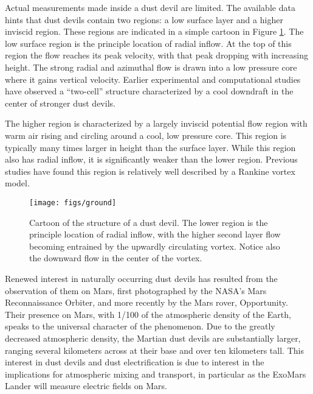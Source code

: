 %
%

Actual measurements made inside a dust devil are limited. The available
data hints that dust devils contain two regions: a low surface layer and
a higher inviscid region. These regions are indicated in a simple
cartoon in Figure \ref{fig:cartoon}. The low surface region is the
principle location of radial inflow. At the top of this region the flow
reaches its peak velocity, with that peak dropping with increasing
height. The strong radial and azimuthal flow is drawn into a low
pressure core where it gains vertical velocity. Earlier experimental and  
computational studies have observed a ``two-cell'' structure
characterized by a cool downdraft in the center of stronger dust
devils\cite{doi:10.3137/ao.420105,Sinclair1973}. 

The higher region is characterized by a largely inviscid potential flow
region with warm air rising and circling around a cool, low pressure
core. This region is typically many times larger in height than the
surface layer. While this region also has radial inflow, it is
significantly weaker than the lower region. Previous studies have found
this region is relatively well described by a Rankine vortex
model\cite{Sinclair1973,logan1971approach}. 

  \begin{figure}[!htb]
    \begin{center}
     \texttt{[image: figs/ground]}
     \caption{Cartoon of the structure of a dust devil. The lower region
     is the principle location of radial inflow, with the higher second
     layer flow becoming entrained by the upwardly circulating
     vortex. Notice also the downward flow in the center of the vortex.}
     \label{fig:cartoon}
    \end{center}
  \end{figure}


Renewed interest in naturally occurring dust devils has resulted from
the observation of them on Mars, first photographed by the NASA's Mars
Reconnaissance Orbiter\cite{?}, and more recently by the Mars rover,
Opportunity. Their presence on Mars, with 1/100 of the atmospheric
density of the Earth, speaks to the universal character of the
phenomenon. Due to the greatly decreased atmospheric density, the
Martian dust devils are substantially larger, ranging several kilometers
across at their base and over ten kilometers tall\cite{?}. This interest
in dust devils and dust electrification is due to interest in the
implications for atmospheric mixing and transport, in particular as the
ExoMars Lander will measure electric fields on Mars\cite{renno_comm}.

